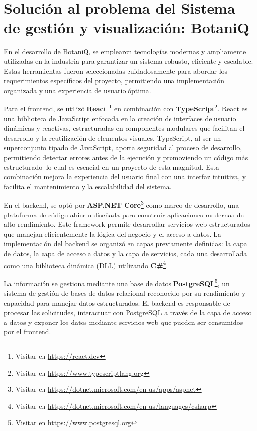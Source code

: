 \section{Solución al problema del Sistema de gestión y visualización: BotaniQ}
En el desarrollo de BotaniQ, se emplearon tecnologías modernas y ampliamente utilizadas en la industria 
para garantizar un sistema robusto, eficiente y escalable. Estas herramientas fueron seleccionadas 
cuidadosamente para abordar los requerimientos específicos del proyecto, permitiendo una implementación 
organizada y una experiencia de usuario óptima.

Para el frontend, se utilizó 
\textbf{React} \footnote{Visitar en \url{https://react.dev}}
en combinación con 
\textbf{TypeScript}\footnote{Visitar en \url{https://www.typescriptlang.org}}. 
React es una biblioteca de JavaScript enfocada en la creación de interfaces de usuario dinámicas y reactivas, estructuradas en componentes 
modulares que facilitan el desarrollo y la reutilización de elementos visuales. TypeScript, al ser un 
superconjunto tipado de JavaScript, aporta seguridad al proceso de desarrollo, permitiendo detectar 
errores antes de la ejecución y promoviendo un código más estructurado, lo cual es esencial en un 
proyecto de esta magnitud. Esta combinación mejora la experiencia del usuario final con una 
interfaz intuitiva, y facilita el mantenimiento y la escalabilidad del sistema.

En el backend, se optó por 
\textbf{ASP.NET Core}\footnote{Visitar en \url{https://dotnet.microsoft.com/en-us/apps/aspnet}}
como marco de desarrollo, una plataforma de código abierto diseñada para construir aplicaciones modernas 
de alto rendimiento. Este framework permite desarrollar servicios web estructurados que manejan eficientemente la lógica 
del negocio y el acceso a datos. 
La implementación del backend se organizó en capas previamente definidas: la capa de datos, la capa de acceso a datos y 
la capa de servicios, cada una desarrollada como una biblioteca dinámica (DLL) utilizando
\textbf{C\#}\footnote{Visitar en \url{https://dotnet.microsoft.com/en-us/languages/csharp}}.

La información se gestiona mediante una base de datos 
\textbf{PostgreSQL}\footnote{Visitar en \url{https://www.postgresql.org}},
un sistema de gestión de bases de datos relacional reconocido por su rendimiento y capacidad para manejar datos 
estructurados. El backend es responsable de procesar las solicitudes, interactuar con PostgreSQL a través de la capa 
de acceso a datos y exponer los datos mediante servicios web que pueden ser consumidos por el frontend.

